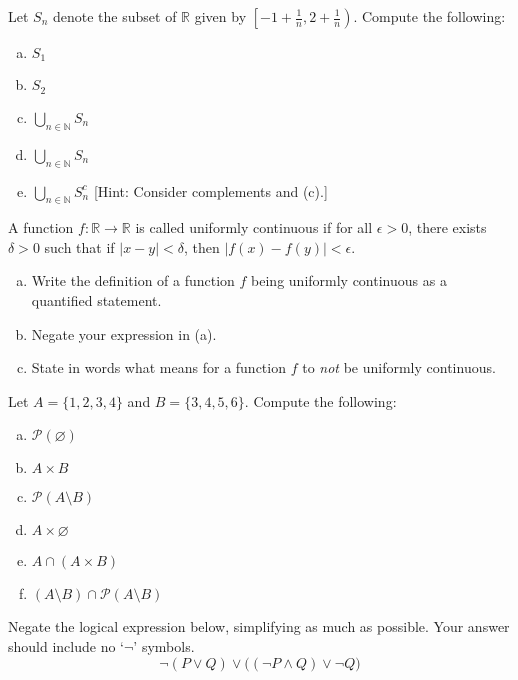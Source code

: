 \documentclass[12pt,letterpaper]{exam}
\begin{document}
\begin{questions}
\newpage
\question[10] Let $S_n$ denote the subset of $\mathbb{R}$ given by $\left[-1 + \frac{1}{n}, 2 + \frac{1}{n} \right)$. Compute the following:
	\begin{enumerate}[(a)]
	\item $S_1$
	\item $S_2$
	\item $\displaystyle \bigcup_{n \in \mathbb{N}} S_n$
	\item $\displaystyle \bigcup_{n \in \mathbb{N}} S_n$
	\item $\displaystyle \bigcup_{n \in \mathbb{N}} S_n^c$ [Hint: Consider complements and (c).]
	\end{enumerate}



\newpage
\question[10] A function $f: \mathbb{R} \to \mathbb{R}$ is called uniformly continuous if for all $\epsilon > 0$, there exists $\delta > 0$ such that if $|x - y| < \delta$, then $|f(x) - f(y)| < \epsilon$. 
	\begin{enumerate}[(a)]
	\item Write the definition of a function $f$ being uniformly continuous as a quantified statement.
	\item Negate your expression in (a).
	\item State in words what means for a function $f$ to \textit{not} be uniformly continuous. 
	\end{enumerate}



\newpage
\question[10] Let $A= \{ 1, 2, 3, 4 \}$ and $B= \{ 3, 4, 5, 6 \}$. Compute the following:
	\begin{enumerate}[(a)]
	\item $\mathcal{P}(\varnothing)$
	\item $A \times B$
	\item $\mathcal{P}(A \setminus B)$
	\item $A \times \varnothing$
	\item $A \cap (A \times B)$
	\item $(A \setminus B) \cap \mathcal{P}(A \setminus B)$
	\end{enumerate}



\newpage
\question[10] Negate the logical expression below, simplifying as much as possible. Your answer should include no `$\neg$' symbols. 
	\[
	\neg(P \vee Q) \vee \big( (\neg P \wedge Q) \vee \neg Q \big)
	\]




\end{questions}
\end{document}
